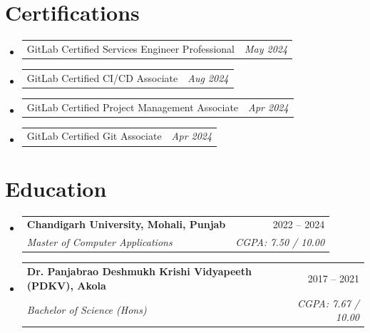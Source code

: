 \documentclass[letterpaper,11pt]{article}
\makeatletter
\newcommand{\resumeSubheading}[4]{
  \item
    \begin{tabular*}{\linewidth}[t]{l@{\extracolsep{\fill}}r}
      \textbf{#1} & #2 \\
      \textit{\small#3} & \textit{\small #4} \\
    \end{tabular*}
}
\newcommand{\resumeProjectHeading}[2]{
  \item
    \begin{tabular*}{\linewidth}{l@{\extracolsep{\fill}}r}
      #1 & #2 \\
    \end{tabular*}
}
\newcommand{\resumeSubHeadingListStart}{\begin{itemize}[leftmargin=0.15in, label={\textbullet}, itemsep=3pt, topsep=0pt, parsep=0pt]}
\newcommand{\resumeSubHeadingListEnd}{\end{itemize}}
\newcommand{\resumeCompactListStart}{\begin{itemize}[leftmargin=0.15in, label={\textbullet}, itemsep=0pt, topsep=0pt, parsep=0pt]}
\makeatother
\begin{document}
\section{Certifications}
\resumeCompactListStart
  \resumeProjectHeading{GitLab Certified Services Engineer Professional}{\textit{May 2024}}
  \resumeProjectHeading{GitLab Certified CI/CD Associate}{\textit{Aug 2024}}
  \resumeProjectHeading{GitLab Certified Project Management Associate}{\textit{Apr 2024}}
  \resumeProjectHeading{GitLab Certified Git Associate}{\textit{Apr 2024}}
\resumeSubHeadingListEnd

\section{Education}
\resumeSubHeadingListStart
  \resumeSubheading
    {Chandigarh University, Mohali, Punjab}{2022 -- 2024}
    {Master of Computer Applications}{CGPA: 7.50 / 10.00}
  \resumeSubheading
    {Dr. Panjabrao Deshmukh Krishi Vidyapeeth (PDKV), Akola}{2017 -- 2021}
    {Bachelor of Science (Hons)}{CGPA: 7.67 / 10.00}
\resumeSubHeadingListEnd
\end{document}

